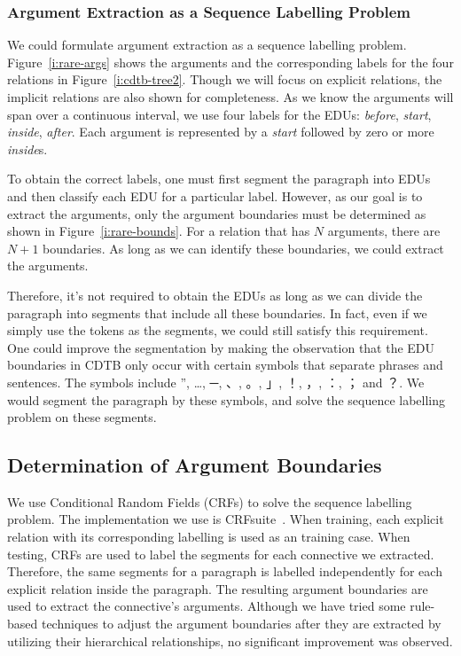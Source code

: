 \subsubsection{Argument Extraction as a Sequence Labelling Problem}

We could formulate argument extraction as a sequence labelling problem.
Figure~\ref{i:rare-args} shows the arguments and the corresponding labels
for the four relations in Figure~\ref{i:cdtb-tree2}. Though we will
focus on explicit relations, the implicit relations are also shown
for completeness.
As we know the arguments will span over a continuous interval,
we use four labels for the EDUs: \textit{before}, \textit{start},
\textit{inside}, \textit{after}. Each argument is represented by
a \textit{start} followed by zero or more \textit{inside}s.



To obtain the correct labels, one must first segment the paragraph
into EDUs and then classify each EDU for a particular label.
However, as our goal is to extract the arguments, only the
argument boundaries must be determined as shown in
Figure~\ref{i:rare-bounds}. For a relation that has $N$ arguments,
there are $N+1$ boundaries. As long as we can identify these boundaries,
we could extract the arguments.




Therefore, it's not required to obtain the EDUs as long as
we can divide the paragraph into segments that include all these boundaries.
In fact, even if we simply use the tokens as the segments, we could still satisfy
this requirement. One could improve the segmentation by making the observation
that the EDU boundaries in CDTB only occur with certain symbols that separate
phrases and sentences. The symbols include ”, …, ─, 、, 。, 」, ！, ，, ：, ； and ？.
We would segment the paragraph by these symbols, and solve the sequence labelling
problem on these segments.

\subsection{Determination of Argument Boundaries}

We use Conditional Random Fields (CRFs) to solve the sequence labelling problem.
The implementation we use is CRFsuite~\citep{CRFsuite}. When training, each explicit
relation with its corresponding labelling is used as an training case. When testing,
CRFs are used to label the segments for each connective we extracted. Therefore,
the same segments for a paragraph is labelled independently for each explicit relation
inside the paragraph. The resulting argument boundaries are used to extract the connective's
arguments. Although we have tried some rule-based techniques to adjust the argument boundaries
after they are extracted by utilizing their hierarchical relationships,
no significant improvement was observed.

